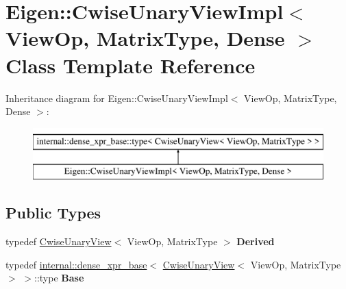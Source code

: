 \hypertarget{class_eigen_1_1_cwise_unary_view_impl_3_01_view_op_00_01_matrix_type_00_01_dense_01_4}{}\section{Eigen\+::Cwise\+Unary\+View\+Impl$<$ View\+Op, Matrix\+Type, Dense $>$ Class Template Reference}
\label{class_eigen_1_1_cwise_unary_view_impl_3_01_view_op_00_01_matrix_type_00_01_dense_01_4}
Inheritance diagram for Eigen\+::Cwise\+Unary\+View\+Impl$<$ View\+Op, Matrix\+Type, Dense $>$\+:\begin{figure}[H]
\begin{center}
\leavevmode
\includegraphics[height=2.000000cm]{class_eigen_1_1_cwise_unary_view_impl_3_01_view_op_00_01_matrix_type_00_01_dense_01_4}
\end{center}
\end{figure}
\subsection*{Public Types}
\begin{DoxyCompactItemize}
\item 
\mbox{\label{class_eigen_1_1_cwise_unary_view_impl_3_01_view_op_00_01_matrix_type_00_01_dense_01_4_a967952b1f7ad8e450c76a4667a692600}} 
typedef \mbox{\hyperlink{class_eigen_1_1_cwise_unary_view}{Cwise\+Unary\+View}}$<$ View\+Op, Matrix\+Type $>$ {\bfseries Derived}
\item 
\mbox{\label{class_eigen_1_1_cwise_unary_view_impl_3_01_view_op_00_01_matrix_type_00_01_dense_01_4_a0c2bbafbe6a06b18c4275b8b0bfb9b64}} 
typedef \mbox{\hyperlink{struct_eigen_1_1internal_1_1dense__xpr__base}{internal\+::dense\+\_\+xpr\+\_\+base}}$<$ \mbox{\hyperlink{class_eigen_1_1_cwise_unary_view}{Cwise\+Unary\+View}}$<$ View\+Op, Matrix\+Type $>$ $>$\+::type {\bfseries Base}
\end{DoxyCompactItemize}
